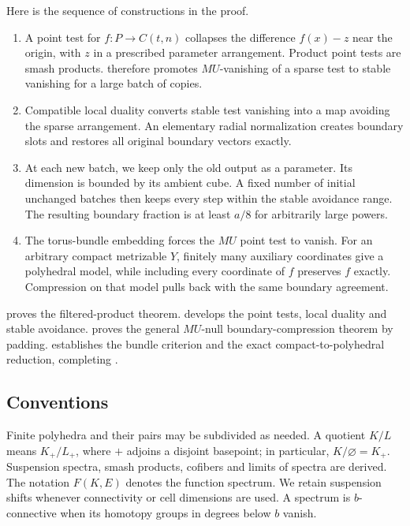 Here is the sequence of constructions in the proof.
\begin{enumerate}
\item A point test for $f:P\to C(t,n)$ collapses the difference
      $f(x)-z$ near the origin, with $z$ in a prescribed parameter
      arrangement.  Product point tests are smash products.
       therefore promotes $MU$-vanishing
      of a sparse test to stable vanishing for a large batch of copies.
\item Compatible local duality converts stable test vanishing into
      a map avoiding the sparse arrangement.  An elementary radial
      normalization creates boundary slots and restores all original
      boundary vectors exactly.
\item At each new batch, we keep only the old output as a parameter.
      Its dimension is bounded by its ambient cube.  A fixed number
      of initial unchanged batches then keeps every step within the
      stable avoidance range.  The resulting boundary fraction is
      at least $a/8$ for arbitrarily large powers.
\item The torus-bundle embedding forces the $MU$ point test to vanish.
      For an arbitrary compact metrizable $Y$, finitely many auxiliary
      coordinates give a polyhedral model, while including every
      coordinate of $f$ preserves $f$ exactly.  Compression on that
      model pulls back with the same boundary agreement.
\end{enumerate}

 proves the filtered-product theorem.
 develops the point tests, local duality and
stable avoidance.   proves the general
$MU$-null boundary-compression theorem by padding.
 establishes the bundle criterion and the
exact compact-to-polyhedral reduction, completing
.

\subsection{Conventions}

Finite polyhedra and their pairs may be subdivided as needed.
A quotient $K/L$ means $K_+/L_+$, where $+$ adjoins a disjoint
basepoint; in particular, $K/\varnothing=K_+$.
Suspension spectra, smash products, cofibers and limits of spectra are
derived.  The notation $F(K,E)$ denotes the function spectrum.
We retain suspension shifts whenever connectivity or cell dimensions
are used.  A spectrum is $b$-connective when its homotopy groups in
degrees below $b$ vanish.
